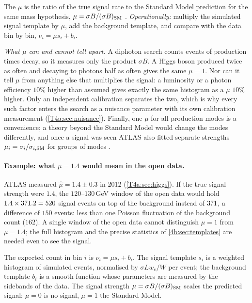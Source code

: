 \begin{workdef}
The  $\mu$ is the ratio of the true signal rate to the Standard Model prediction for the same mass hypothesis, $\mu=\sigma B/(\sigma B)_{\rm SM}$ . \emph{Operationally:} multiply the simulated signal template by $\mu$, add the background template, and compare with the data bin by bin, $\nu_i=\mu s_i+b_i$.
\end{workdef}

\emph{What $\mu$ can and cannot tell apart.} A diphoton search counts events of production times decay, so it measures only the product $\sigma B$. A Higgs boson produced twice as often and decaying to photons half as often gives the same $\mu=1$. Nor can it tell $\mu$ from anything else that multiplies the signal: a luminosity or a photon efficiency $10\%$ higher than assumed gives exactly the same histogram as a $\mu$ $10\%$ higher. Only an independent calibration separates the two, which is why every such factor enters the search as a nuisance parameter with its own calibration measurement (\cref{T4a:sec:nuisance}). Finally, one $\mu$ for all production modes is a convenience; a theory beyond the Standard Model would change the modes differently, and once a signal was seen ATLAS also fitted separate strengths $\mu_i=\sigma_i/\sigma_{i,\rm SM}$ for groups of modes \cite[Sec.~9.3]{AadHiggs2012}.

\paragraph{Example: what $\mu=1.4$ would mean in the open data.}
ATLAS measured $\hat\mu=1.4\pm0.3$ in 2012 (\cref{T4a:sec:higgs}). If the true signal strength were $1.4$, the $120$--$130$\,GeV window of the open data would hold $1.4\times\tfouraR{1}{\TfdSwin}=520$ signal events on top of the background instead of $\tfouraR{0}{\TfdSwin}$, a difference of $150$ events: less than one Poisson fluctuation of the background count ($162$). A single window of the open data cannot distinguish $\mu=1$ from $\mu=1.4$; the full histogram and the precise statistics of \cref{4b:sec:templates} are needed even to see the signal.

\begin{keyidea}
The expected count in bin $i$ is $\nu_i=\mu s_i+b_i$. The signal template $s_i$ is a weighted histogram of simulated events, normalised by $\sigma L w_e/W$ per event; the background template $b_i$ is a smooth function whose parameters are measured by the sidebands of the data. The signal strength $\mu=\sigma B/(\sigma B)_{\rm SM}$ scales the predicted signal: $\mu=0$ is no signal, $\mu=1$ the Standard Model.
\end{keyidea}

